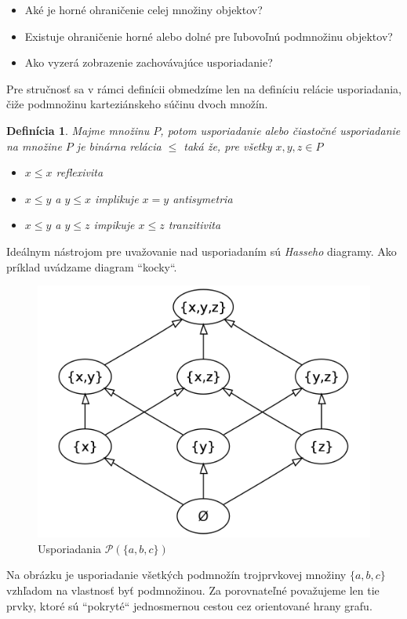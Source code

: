 \documentclass[a4paper,10pt,oneside]{report}%
\newtheorem{definition}{Definícia}[chapter]
\begin{document}
\begin{itemize}
    \item Aké je horné ohraničenie celej množiny objektov?
    \item Existuje ohraničenie horné alebo dolné pre ľubovoľnú podmnožinu objektov?
    \item Ako vyzerá zobrazenie zachovávajúce usporiadanie?
\end{itemize}
    Pre stručnosť sa v rámci definícii obmedzíme len na definíciu relácie usporiadania,
čiže podmnožinu karteziánskeho súčinu dvoch množín.
\begin{definition}
    Majme množinu $P$, potom usporiadanie alebo čiastočné usporiadanie na množine
    $P$ je binárna relácia $\leq$ taká že, pre všetky $x,y,z \in P$
    \begin{itemize}
        \item $x \leq x$ reflexivita
        \item $x \leq y$ a $y \leq x$ implikuje $x = y$ antisymetria
        \item $x \leq y$ a $y \leq z$ impikuje $x \leq z$ tranzitivita
    \end{itemize}
\end{definition}
    Ideálnym nástrojom pre uvažovanie nad usporiadaním sú \emph{Hasseho} diagramy.
    Ako príklad uvádzame diagram ``kocky``.
\begin{figure}[!ht]
    \centering
    \includegraphics[scale=0.20]{cube.png}
    \caption{Usporiadania $\mathcal{P}(\{a,b,c\})$}
\end{figure}
    Na obrázku je usporiadanie všetkých podmnožín trojprvkovej množiny $\{ a,b,c \}$
vzhľadom na vlastnosť byť podmnožinou.
    Za porovnateľné považujeme len tie prvky, ktoré sú ``pokryté`` jednosmernou cestou 
cez orientované hrany grafu.
\end{document}

